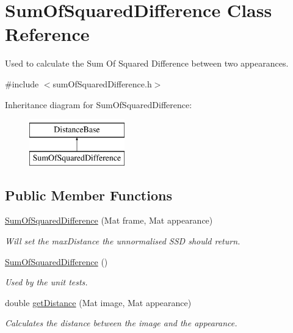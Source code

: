 \hypertarget{class_sum_of_squared_difference}{}\section{Sum\+Of\+Squared\+Difference Class Reference}
\label{class_sum_of_squared_difference}


Used to calculate the Sum Of Squared Difference between two appearances.  




{\ttfamily \#include $<$sum\+Of\+Squared\+Difference.\+h$>$}

Inheritance diagram for Sum\+Of\+Squared\+Difference\+:\begin{figure}[H]
\begin{center}
\leavevmode
\includegraphics[height=2.000000cm]{class_sum_of_squared_difference}
\end{center}
\end{figure}
\subsection*{Public Member Functions}
\begin{DoxyCompactItemize}
\item 
\hyperlink{class_sum_of_squared_difference_af922c956c34c21fd1f361ff17c8e74dd}{Sum\+Of\+Squared\+Difference} (Mat frame, Mat appearance)
\begin{DoxyCompactList}\small\item\em Will set the max\+Distance the unnormalised S\+S\+D should return. \end{DoxyCompactList}\item 
\hypertarget{class_sum_of_squared_difference_ac9d3e8ddd24e68dab66f712f7810e6bd}{}\hyperlink{class_sum_of_squared_difference_ac9d3e8ddd24e68dab66f712f7810e6bd}{Sum\+Of\+Squared\+Difference} ()\label{class_sum_of_squared_difference_ac9d3e8ddd24e68dab66f712f7810e6bd}

\begin{DoxyCompactList}\small\item\em Used by the unit tests. \end{DoxyCompactList}\item 
double \hyperlink{class_sum_of_squared_difference_acd647d0817edf9cce383caa657ab46fa}{get\+Distance} (Mat image, Mat appearance)
\begin{DoxyCompactList}\small\item\em Calculates the distance between the image and the appearance. \end{DoxyCompactList}\end{DoxyCompactItemize}

